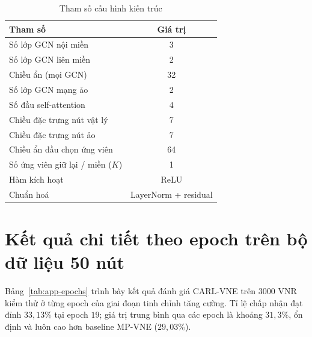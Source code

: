\documentclass[../DoAn.tex]{subfiles}
\begin{document}
\begin{table}[H]
\centering
\caption{Tham số cấu hình kiến trúc}
\label{tab:app-arch}
\begin{tabular}{lc}
\toprule
\textbf{Tham số} & \textbf{Giá trị} \\
\midrule
Số lớp GCN nội miền        & 3 \\
Số lớp GCN liên miền       & 2 \\
Chiều ẩn (mọi GCN)         & 32 \\
Số lớp GCN mạng ảo         & 2 \\
Số đầu self-attention      & 4 \\
Chiều đặc trưng nút vật lý & 7 \\
Chiều đặc trưng nút ảo     & 7 \\
Chiều ẩn đầu chọn ứng viên & 64 \\
Số ứng viên giữ lại / miền ($K$) & 1 \\
Hàm kích hoạt              & ReLU \\
Chuẩn hoá                  & LayerNorm + residual \\
\bottomrule
\end{tabular}
\end{table}

\section{Kết quả chi tiết theo epoch trên bộ dữ liệu 50 nút}
\label{sec:app-epochs}

Bảng~\ref{tab:app-epochs} trình bày kết quả đánh giá CARL-VNE trên $3000$ VNR kiểm thử ở từng epoch của giai đoạn tinh chỉnh tăng cường. Tỉ lệ chấp nhận đạt đỉnh $33{,}13\%$ tại epoch $19$; giá trị trung bình qua các epoch là khoảng $31{,}3\%$, ổn định và luôn cao hơn baseline MP-VNE ($29{,}03\%$).
\end{document}
